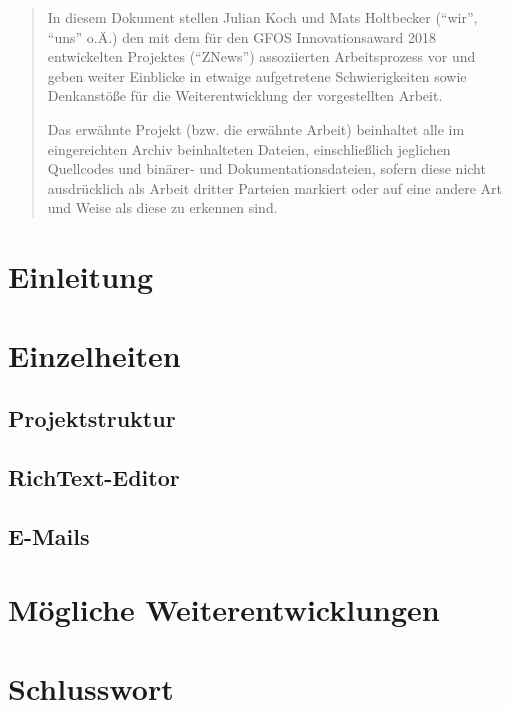 

\newcommand*{\thetitle}{ZNews\\ Dokumentation}

\Begin

\begin{abstract}
    In diesem Dokument stellen Julian Koch und Mats Holtbecker
    (``wir'', ``uns'' o.Ä.)
    den mit dem für den GFOS Innovationsaward 2018 entwickelten Projektes (``ZNews'')
    assoziierten Arbeitsprozess vor
    und geben weiter Einblicke in etwaige aufgetretene Schwierigkeiten
    sowie Denkanstöße für die Weiterentwicklung der vorgestellten Arbeit.

    Das erwähnte Projekt (bzw. die erwähnte Arbeit)
    beinhaltet alle im eingereichten Archiv beinhalteten Dateien,
    einschließlich jeglichen Quellcodes und binärer- und Dokumentationsdateien,
    sofern diese nicht ausdrücklich als Arbeit dritter Parteien markiert
    oder auf eine andere Art und Weise als diese zu erkennen sind.
\end{abstract}

\newpage

\section{Einleitung}


\section{Einzelheiten}

\subsection{Projektstruktur}


\subsection{RichText-Editor}


\subsection{E-Mails}


\section{Mögliche Weiterentwicklungen}


\section{Schlusswort}


\End
